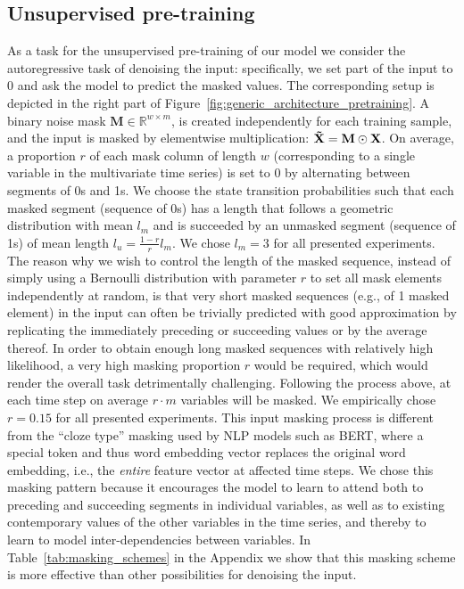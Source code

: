 \documentclass{article} \usepackage{iclr2021_conference,times}
\begin{document}
\subsection{Unsupervised pre-training} \label{sec:unsupervised_pretraining}
	
As a task for the unsupervised pre-training of our model we consider the autoregressive task of denoising the input: specifically, we set part of the input to 0 and ask the model to predict the masked values. The corresponding setup is depicted in the right part of Figure~\ref{fig:generic_architecture_pretraining}. A binary noise mask $\mathbf{M} \in \mathbb{R}^{w\times m}$, is created independently for each training sample, and the input is masked by elementwise multiplication: $\mathbf{\Tilde{X}} = \mathbf{M} \odot \mathbf{X}$. On average, a proportion $r$ of each mask column of length $w$ (corresponding to a single variable in the multivariate time series) is set to 0 by alternating between segments of 0s and 1s. We choose the state transition probabilities such that each masked segment (sequence of 0s) has a length that follows a geometric distribution with mean $l_m$ and is succeeded by an unmasked segment (sequence of 1s) of mean length $l_u = \frac{1-r}{r}l_m$. We chose $l_m = 3$ for all presented experiments. The reason why we wish to control the length of the masked sequence, instead of simply using a Bernoulli distribution with parameter $r$ to set all mask elements independently at random, is that very short masked sequences (e.g., of 1 masked element) in the input can often be trivially predicted with good approximation by replicating the immediately preceding or succeeding values or by the average thereof. In order to obtain enough long masked sequences with relatively high likelihood, a very high masking proportion $r$ would be required, which would render the overall task detrimentally challenging. Following the process above, at each time step on average $r\cdot m$ variables will be masked. We empirically chose $r=0.15$ for all presented experiments. This input masking process is different from the ``cloze type'' masking used by NLP models such as BERT, where a special token and thus word embedding vector replaces the original word embedding, i.e., the \textit{entire} feature vector at affected time steps. We chose this masking pattern because it encourages the model to learn to attend both to preceding and succeeding segments in individual variables, as well as to existing contemporary values of the other variables in the time series, and thereby to learn to model inter-dependencies between variables. In Table~\ref{tab:masking_schemes} in the Appendix we show that this masking scheme is more effective than other possibilities for denoising the input.
\end{document}
